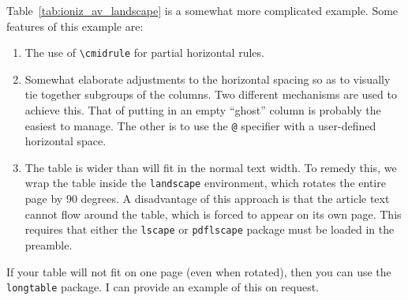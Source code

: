 \documentclass[debug]{rmxaa}
\newcommand{\CS}[1]{\texttt{\textbackslash #1}}
\begin{document}
Table~\ref{tab:ioniz_av_landscape} is a somewhat more complicated
example. Some features of this example are:
\begin{enumerate}
\item The use of \CS{cmidrule} for partial horizontal rules. 
\item Somewhat elaborate adjustments to the horizontal spacing so as
  to visually tie together subgroups of the columns. Two different
  mechanisms are used to achieve this. That of putting in an empty
  ``ghost'' column is probably the easiest to manage. The other is to
  use the \verb+@+ specifier with a user-defined horizontal space.
\item The table is wider than will fit in the normal text width. To
  remedy this, we wrap the table inside the \texttt{landscape}
  environment, which rotates the entire page by 90 degrees.  A
  disadvantage of this approach is that the article text cannot flow
  around the table, which is forced to appear on its own page.  This
  requires that either the \texttt{lscape} or \texttt{pdflscape}
  package must be loaded in the preamble. 
\end{enumerate}

If your table will not fit on one page (even when rotated), then you
can use the \texttt{longtable} package. I can provide an example of
this on request.
\end{document}
